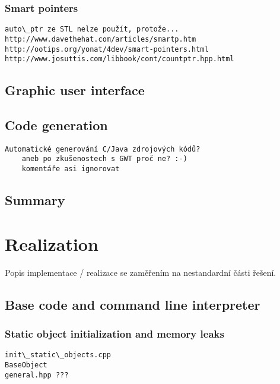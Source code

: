 \documentclass[11pt,twoside,a4paper]{book}
\begin{document}
\subsection{Smart pointers}

\begin{verbatim}
auto\_ptr ze STL nelze použít, protože...
http://www.davethehat.com/articles/smartp.htm
http://ootips.org/yonat/4dev/smart-pointers.html
http://www.josuttis.com/libbook/cont/countptr.hpp.html
\end{verbatim}

\section{Graphic user interface}


\section{Code generation}

\begin{verbatim}
Automatické generování C/Java zdrojových kódů?
	aneb po zkušenostech s GWT proč ne? :-)
	komentáře asi ignorovat
\end{verbatim}


\section{Summary}




\chapter{Realization}

Popis implementace / realizace se zaměřením na nestandardní části řešení.

\section{Base code and command line interpreter}

\subsection{Static object initialization and memory leaks}

\begin{verbatim}
init\_static\_objects.cpp
BaseObject
general.hpp ???
\end{verbatim}
\end{document}
